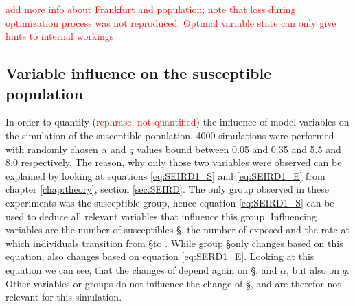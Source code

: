 \textcolor{red}{add more info about Frankfurt and population; note that loss during optimization process was not reproduced.
Optimal variable state can only give hints to internal workings}

\subsection{Variable influence on the susceptible population}
In order to quantify (\textcolor{red}{rephrase, not quantified}) the influence of model variables on the simulation of the
susceptible population, 4000 simulations were performed with randomly chosen $\alpha$ and $q$ values bound between 0.05 and 0.35
and 5.5 and 8.0 respectively. The reason, why only those two variables were observed can be explained by looking at equations
\ref{eq:SEIRD1_S} and \ref{eq:SEIRD1_E} from chapter \ref*{chap:theory},
section \ref*{sec:SEIRD}. The only group observed in these experiments was the susceptible group, hence equation \ref*{eq:SEIRD1_S}
can be used to deduce all relevant variables that influence this group. Influencing variables are the number of susceptibles \S,
the number of exposed \E and the rate at which individuals transition from \S to \E. While group \S only changes based on this
equation, \E also changes based on equation \ref*{eq:SERD1_E}. Looking at this equation we can see, that the changes of \E depend
again on \S, \E and $\alpha$, but also on $q$. Other variables or groups do not influence the change of \S, and are therefor not
relevant for this simulation. \newline

